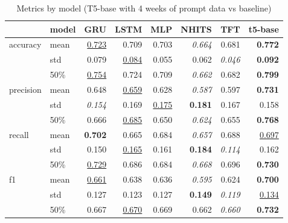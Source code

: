 \begin{table}
\caption{Metrics by model (T5-base with 4 weeks of prompt data vs baseline)}
\label{tab:metrics_by_model}
\begin{tabular}{llrrrrrr}
\toprule
 & model & GRU & LSTM & MLP & NHITS & TFT & t5-base \\
\midrule
\multirow[c]{3}{*}{accuracy} & mean & \underline{0.723} & 0.709 & 0.703 & \textit{0.664} & 0.681 & \textbf{0.772} \\
 & std & 0.079 & \underline{0.084} & 0.055 & 0.062 & \textit{0.046} & \textbf{0.092} \\
 & 50\% & \underline{0.754} & 0.724 & 0.709 & \textit{0.662} & 0.682 & \textbf{0.799} \\
\cline{1-8}
\multirow[c]{3}{*}{precision} & mean & 0.648 & \underline{0.659} & 0.628 & \textit{0.587} & 0.597 & \textbf{0.731} \\
 & std & \textit{0.154} & 0.169 & \underline{0.175} & \textbf{0.181} & 0.167 & 0.158 \\
 & 50\% & 0.666 & \underline{0.685} & 0.650 & \textit{0.624} & 0.655 & \textbf{0.768} \\
\cline{1-8}
\multirow[c]{3}{*}{recall} & mean & \textbf{0.702} & 0.665 & 0.684 & \textit{0.657} & 0.688 & \underline{0.697} \\
 & std & 0.150 & \underline{0.165} & 0.161 & \textbf{0.184} & \textit{0.114} & 0.162 \\
 & 50\% & \underline{0.729} & 0.686 & 0.684 & \textit{0.668} & 0.696 & \textbf{0.730} \\
\cline{1-8}
\multirow[c]{3}{*}{f1} & mean & \underline{0.661} & 0.638 & 0.636 & \textit{0.595} & 0.624 & \textbf{0.700} \\
 & std & 0.127 & 0.123 & 0.127 & \textbf{0.149} & \textit{0.119} & \underline{0.134} \\
 & 50\% & 0.667 & \underline{0.670} & 0.669 & 0.662 & \textit{0.660} & \textbf{0.732} \\
\cline{1-8}
\bottomrule
\end{tabular}
\end{table}
